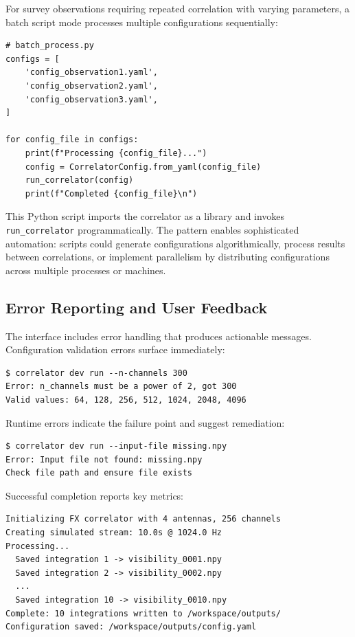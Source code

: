 For survey observations requiring repeated correlation with varying parameters, a batch script mode processes multiple configurations sequentially:

\begin{verbatim}
# batch_process.py
configs = [
    'config_observation1.yaml',
    'config_observation2.yaml',
    'config_observation3.yaml',
]

for config_file in configs:
    print(f"Processing {config_file}...")
    config = CorrelatorConfig.from_yaml(config_file)
    run_correlator(config)
    print(f"Completed {config_file}\n")
\end{verbatim}

This Python script imports the correlator as a library and invokes \texttt{run\_correlator} programmatically. The pattern enables sophisticated automation: scripts could generate configurations algorithmically, process results between correlations, or implement parallelism by distributing configurations across multiple processes or machines.

\subsection{Error Reporting and User Feedback}

The interface includes error handling that produces actionable messages. Configuration validation errors surface immediately:

\begin{verbatim}
$ correlator dev run --n-channels 300
Error: n_channels must be a power of 2, got 300
Valid values: 64, 128, 256, 512, 1024, 2048, 4096
\end{verbatim}

Runtime errors indicate the failure point and suggest remediation:

\begin{verbatim}
$ correlator dev run --input-file missing.npy
Error: Input file not found: missing.npy
Check file path and ensure file exists
\end{verbatim}

Successful completion reports key metrics:

\begin{verbatim}
Initializing FX correlator with 4 antennas, 256 channels
Creating simulated stream: 10.0s @ 1024.0 Hz
Processing...
  Saved integration 1 -> visibility_0001.npy
  Saved integration 2 -> visibility_0002.npy
  ...
  Saved integration 10 -> visibility_0010.npy
Complete: 10 integrations written to /workspace/outputs/
Configuration saved: /workspace/outputs/config.yaml
\end{verbatim}

